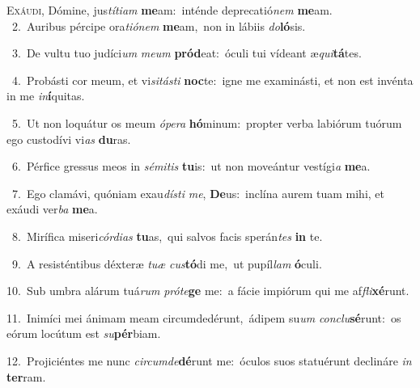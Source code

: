 \lettrine{\initial\textcolor{\initialcolor}{E}}{xáudi,} Dómine, jus\-\textit{tí}\-\textit{ti}\textit{am} \textbf{me}\-am:~\star inténde deprecatió\textit{nem} \textbf{me}\-am.\\
{\numbfont\textcolor{\numbcolor}{~2.}}~Auribus pércipe ora\-\textit{ti}\-\textit{ó}\textit{nem} \textbf{me}\-am,~\star non in lábiis \textit{do}\-\textbf{ló}sis.\par
{\numbfont\textcolor{\numbcolor}{~3.}}~De vultu tuo judíci\textit{um} \textit{me}\-\textit{um} \textbf{pród}\-eat:~\star óculi tui vídeant æ\-\textit{qui}\-\textbf{tá}tes.\par
{\numbfont\textcolor{\numbcolor}{~4.}}~Probásti cor meum, et vi\-\textit{si}\-\textit{tás}\textit{ti} \textbf{noc}\-te:~\star igne me examinásti, et non est invénta in me \textit{in}\-\textbf{í}quitas.\par
{\numbfont\textcolor{\numbcolor}{~5.}}~Ut non loquátur os meum \textit{ó}\-\textit{pe}\textit{ra} \textbf{hó}\-minum:~\star propter verba labiórum tuórum ego custodívi vi\textit{as} \textbf{du}\-ras.\par
{\numbfont\textcolor{\numbcolor}{~6.}}~Pérfice gressus meos in \textit{sé}\-\textit{mi}\textit{tis} \textbf{tu}\-is:~\star ut non moveántur vestígi\textit{a} \textbf{me}\-a.\par
{\numbfont\textcolor{\numbcolor}{~7.}}~Ego clamávi, quóniam exau\-\textit{dís}\-\textit{ti} \textit{me}\-, \textbf{De}\-us:~\star inclína aurem tuam mihi, et exáudi ver\textit{ba} \textbf{me}\-a.\par
{\numbfont\textcolor{\numbcolor}{~8.}}~Mirífica miseri\-\textit{cór}\-\textit{di}\textit{as} \textbf{tu}\-as,~\star qui salvos facis sperán\textit{tes} \textbf{in} te.\par
{\numbfont\textcolor{\numbcolor}{~9.}}~A resisténtibus déxteræ \textit{tu}\-\textit{æ} \textit{cus}\-\textbf{tó}di me,~\star ut pupíl\textit{lam} \textbf{ó}\-culi.\par
{\numbfont\textcolor{\numbcolor}{10.}}~Sub umbra alárum tuá\textit{rum} \textit{pró}\-\textit{te}\textbf{ge} me:~\star a fácie impiórum qui me af\-\textit{fli}\-\textbf{xé}runt.\par
{\numbfont\textcolor{\numbcolor}{11.}}~Inimíci mei ánimam meam circumdedérunt,~\dagger ádipem su\textit{um} \textit{con}\-\textit{clu}\textbf{sé}runt:~\star os eórum locútum est \textit{su}\-\textbf{pér}biam.\par
{\numbfont\textcolor{\numbcolor}{12.}}~Projiciéntes me nunc \textit{cir}\-\textit{cum}\textit{de}\textbf{dé}runt me:~\star óculos suos statuérunt declináre \textit{in} \textbf{ter}\-ram.\par
